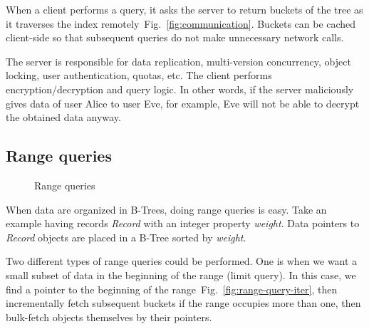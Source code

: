 \documentclass[notitlepage,longbibliography]{revtex4-1}
\newcommand{\figref}[1]{Fig.~\ref{#1}}
\begin{document}
When a client performs a query, it asks the server to return buckets of the tree as it traverses the index remotely~\figref{fig:communication}.
Buckets can be cached client-side so that subsequent queries do not make unnecessary network calls.

The server is responsible for data replication, multi-version concurrency, object locking, user authentication, quotas, etc.
The client performs encryption/decryption and query logic.
In other words, if the server maliciously gives data of user Alice to user Eve, for example,
Eve will not be able to decrypt the obtained data anyway.

\subsection{Range queries}

\begin{figure}
	\begin{center}
        \qquad
	\end{center}
	\caption{Range queries}
	\label{fig:range-query}
\end{figure}

When data are organized in B-Trees, doing range queries is easy.
Take an example having records \emph{Record} with an integer property \emph{weight}.
Data pointers to \emph{Record} objects are placed in a B-Tree sorted by \emph{weight}.

Two different types of range queries could be performed.
One is when we want a small subset of data in the beginning of the range (limit query).
In this case, we find a pointer to the beginning of the range~\figref{fig:range-query-iter}, then incrementally fetch subsequent buckets if the range occupies more than one, then bulk-fetch objects themselves by their pointers.
\end{document}
